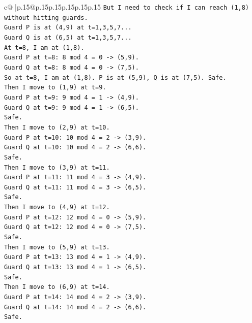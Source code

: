 \documentclass{article}
\begin{document}
{\begin{supertabular}{c@{$\;$}|p{.15\linewidth}@{}p{.15\linewidth}p{.15\linewidth}p{.15\linewidth}p{.15\linewidth}p{.15\linewidth}}
{{{\texttt{But I need to check if I can reach (1,8) without hitting guards.} \\
\texttt{Guard P is at (4,9) at t=1,3,5,7...} \\
\texttt{Guard Q is at (6,5) at t=1,3,5,7...} \\
\texttt{At t=8, I am at (1,8).} \\
\texttt{Guard P at t=8: 8 mod 4 = 0 {-}> (5,9).} \\
\texttt{Guard Q at t=8: 8 mod 4 = 0 {-}> (7,5).} \\
\texttt{So at t=8, I am at (1,8). P is at (5,9), Q is at (7,5). Safe.} \\
\texttt{Then I move to (1,9) at t=9.} \\
\texttt{Guard P at t=9: 9 mod 4 = 1 {-}> (4,9).} \\
\texttt{Guard Q at t=9: 9 mod 4 = 1 {-}> (6,5).} \\
\texttt{Safe.} \\
\texttt{Then I move to (2,9) at t=10.} \\
\texttt{Guard P at t=10: 10 mod 4 = 2 {-}> (3,9).} \\
\texttt{Guard Q at t=10: 10 mod 4 = 2 {-}> (6,6).} \\
\texttt{Safe.} \\
\texttt{Then I move to (3,9) at t=11.} \\
\texttt{Guard P at t=11: 11 mod 4 = 3 {-}> (4,9).} \\
\texttt{Guard Q at t=11: 11 mod 4 = 3 {-}> (6,5).} \\
\texttt{Safe.} \\
\texttt{Then I move to (4,9) at t=12.} \\
\texttt{Guard P at t=12: 12 mod 4 = 0 {-}> (5,9).} \\
\texttt{Guard Q at t=12: 12 mod 4 = 0 {-}> (7,5).} \\
\texttt{Safe.} \\
\texttt{Then I move to (5,9) at t=13.} \\
\texttt{Guard P at t=13: 13 mod 4 = 1 {-}> (4,9).} \\
\texttt{Guard Q at t=13: 13 mod 4 = 1 {-}> (6,5).} \\
\texttt{Safe.} \\
\texttt{Then I move to (6,9) at t=14.} \\
\texttt{Guard P at t=14: 14 mod 4 = 2 {-}> (3,9).} \\
\texttt{Guard Q at t=14: 14 mod 4 = 2 {-}> (6,6).} \\
\texttt{Safe.} \\
}}}
\end{supertabular}}
\end{document}
